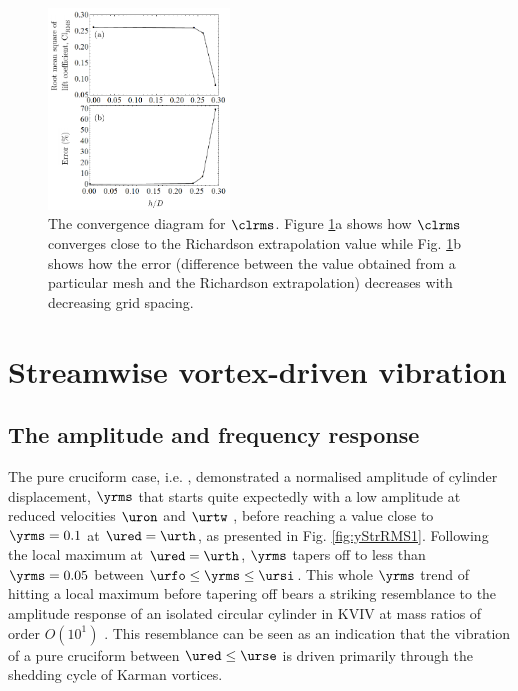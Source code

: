 \documentclass[a4paper,fleqn]{cas-sc}
\begin{document}
\begin{figure}
  \centering
  \includegraphics[width=0.43\textwidth]{figs/figure9}
  \caption{The convergence diagram for $\clrms$. Figure \ref{fig:clrmsGCI}a shows how $\clrms$ converges close to the Richardson extrapolation value while Fig. \ref{fig:clrmsGCI}b shows how the error (difference between the value obtained from a particular mesh and the Richardson extrapolation) decreases with decreasing grid spacing.} \label{fig:clrmsGCI}
\end{figure}

\section{Streamwise vortex-driven vibration}\label{sec:svivRegime}

\subsection{The amplitude and frequency response}\label{ssec:svivRegimeAmpFreqResp}

The pure cruciform case, i.e. \angfi{}, demonstrated a normalised \rms{} amplitude of cylinder displacement, $\yrms$ that starts quite expectedly with a low amplitude at reduced velocities $\uron$ and $\urtw$ , before reaching a value close to $\yrms = 0.1$ at $\ured = \urth$, as presented in Fig. \ref{fig:yStrRMS1}. Following the local maximum at $\ured = \urth$, $\yrms$ tapers off to less than $\yrms = 0.05$ between $\urfo \leq \yrms \leq \ursi$. This whole $\yrms$ trend of hitting a local maximum before tapering off bears a striking resemblance to the amplitude response of an isolated circular cylinder in KVIV at mass ratios of order $O(10^{1})$ \citep{Feng1963,Khalak1999}. This resemblance can be seen as an indication that the vibration of a pure cruciform between $\ured \leq \urse$ is driven primarily through the shedding cycle of Karman vortices.
\end{document}
